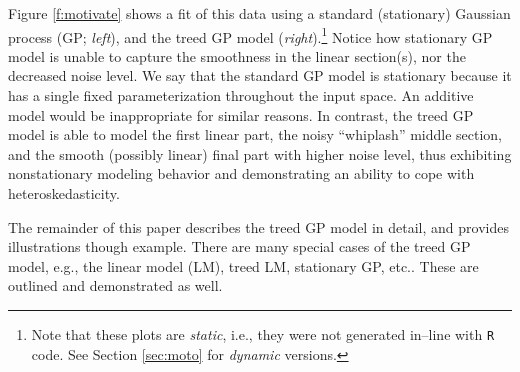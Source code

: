 Figure \ref{f:motivate} shows a fit of this data using a standard
(stationary) Gaussian process (GP; {\em left}), and the treed GP model
({\em right}).\footnote{Note that these plots are {\em static}, i.e.,
  they were not generated in--line with {\tt R} code.  See Section
  \ref{sec:moto} for {\em dynamic} versions.}  Notice how stationary
GP model is unable to capture the smoothness in the linear section(s),
nor the decreased noise level.  We say that the standard GP model is
stationary because it has a single fixed parameterization throughout
the input space.  An additive model would be inappropriate for similar
reasons.  In contrast, the treed GP model is able to model the first
linear part, the noisy ``whiplash'' middle section, and the smooth
(possibly linear) final part with higher noise level, thus exhibiting
nonstationary modeling behavior and demonstrating an ability to cope
with heteroskedasticity.

The remainder of this paper describes the treed GP model in detail,
and provides illustrations though example.  There are many special
cases of the treed GP model, e.g., the linear model (LM), treed LM,
stationary GP, etc.. These are outlined and demonstrated as well.


